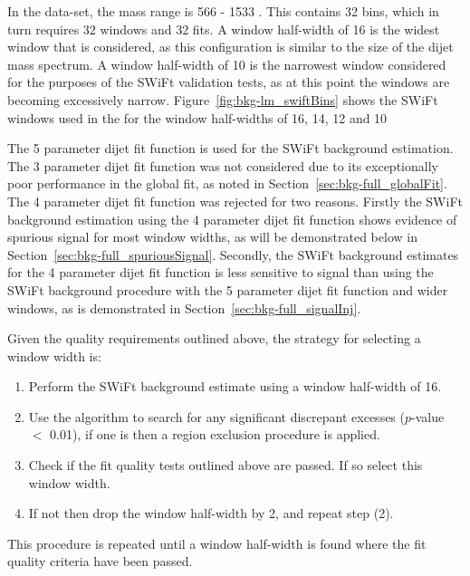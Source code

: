 
In the \lm{} data-set, the mass range is 566 - 1533 \GeV{}. This contains 32 bins, which in turn requires 32 windows and 32 fits.
A window half-width of 16 is  the widest window that is considered,
as this configuration is similar to the size of the dijet mass spectrum.
A window half-width of 10 is the narrowest window considered for the purposes of the SWiFt validation tests,
as at this point the windows are becoming excessively narrow.
Figure~\ref{fig:bkg-lm_swiftBins} shows the SWiFt windows used in the for the window half-widths of 16, 14, 12 and 10

The 5 parameter dijet fit function is used for the SWiFt background estimation.
The 3 parameter dijet fit function was not considered due to its exceptionally poor performance in the global fit, as noted in Section~\ref{sec:bkg-full_globalFit}.
The 4 parameter dijet fit function was rejected for two reasons.
Firstly the SWiFt background estimation using the 4 parameter dijet fit function shows evidence of spurious signal for most window widths,
as will be demonstrated below in Section~\ref{sec:bkg-full_spuriousSignal}.
Secondly, the SWiFt background estimates for the 4 parameter dijet fit function is less sensitive to signal than
using the SWiFt background procedure with the 5 parameter dijet fit function and wider windows, as is demonstrated in Section~\ref{sec:bkg-full_signalInj}.

\noindent
Given the quality requirements outlined above, the strategy for selecting a window width is:
\begin{enumerate}
\item Perform the SWiFt background estimate using a window half-width of 16.
\item Use the \bh{} algorithm to search for any significant discrepant excesses (\mbox{$p$-value} $<$ 0.01),
  if one is then a region exclusion procedure is applied.
\item Check if the fit quality tests outlined above are passed. If so select this window width.
\item If not then drop the window half-width by 2, and repeat step (2).
\end{enumerate}
This procedure is repeated until a window half-width is found where the fit quality criteria have been passed.

